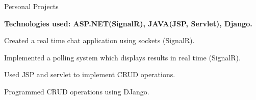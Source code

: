 \begin{cventries}
  \cventry
    { }
    {Personal Projects}
    {}
    {}
    {
      \begin{cvitemsForEducation}
        \item[] {\textbf{Technologies used: ASP.NET(SignalR), JAVA(JSP, Servlet),  Django.}}
        \item {Created a real time chat application using sockets (SignalR).}
        \item {Implemented a polling system which displays results in real time (SignalR).}
        \item {Used JSP and servlet to implement CRUD operations.}
        \item {Programmed CRUD operations using DJango.}
      \end{cvitemsForEducation}
    }
\end{cventries}
